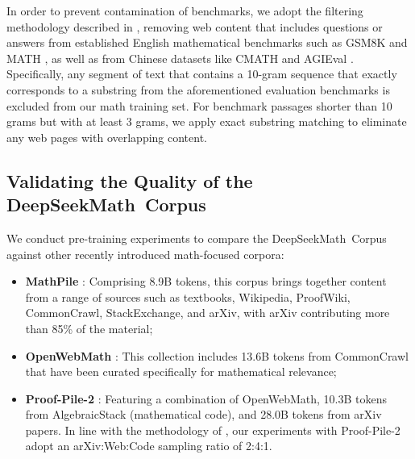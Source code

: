 \begin{itemize}[topsep=0pt]
\begin{itemize}[topsep=0pt]
In order to prevent contamination of benchmarks, we adopt the filtering methodology described in \cite{deepseek-coder}, removing web content that includes questions or answers from established English mathematical benchmarks such as GSM8K \citep{gsm8k} and MATH \citep{MATH}, as well as from Chinese datasets like CMATH \citep{wei2023cmath} and AGIEval \citep{agieval}. Specifically, any segment of text that contains a 10-gram sequence that exactly corresponds to a substring from the aforementioned evaluation benchmarks is excluded from our math training set. For benchmark passages shorter than 10 grams but with at least 3 grams, we apply exact substring matching to eliminate any web pages with overlapping content.

\subsection{Validating the Quality of the DeepSeekMath~Corpus}

We conduct pre-training experiments to compare the DeepSeekMath~Corpus against other recently introduced math-focused corpora:

\begin{itemize}[topsep=0pt]
    \item \textbf{MathPile} \citep{mathpile}: Comprising 8.9B tokens, this corpus brings together content from a range of sources such as textbooks, Wikipedia, ProofWiki, CommonCrawl, StackExchange, and arXiv, with arXiv contributing more than 85\% of the material;
    \item \textbf{OpenWebMath} \citep{openwebmath}: This collection includes 13.6B tokens from CommonCrawl that have been curated specifically for mathematical relevance;
    \item \textbf{Proof-Pile-2} \citep{llemma}: Featuring a combination of OpenWebMath, 10.3B tokens from AlgebraicStack (mathematical code), and 28.0B tokens from arXiv papers. In line with the methodology of \cite{llemma}, our experiments with Proof-Pile-2 adopt an arXiv:Web:Code sampling ratio of 2:4:1.
\end{itemize}


\end{itemize}
\end{itemize}
